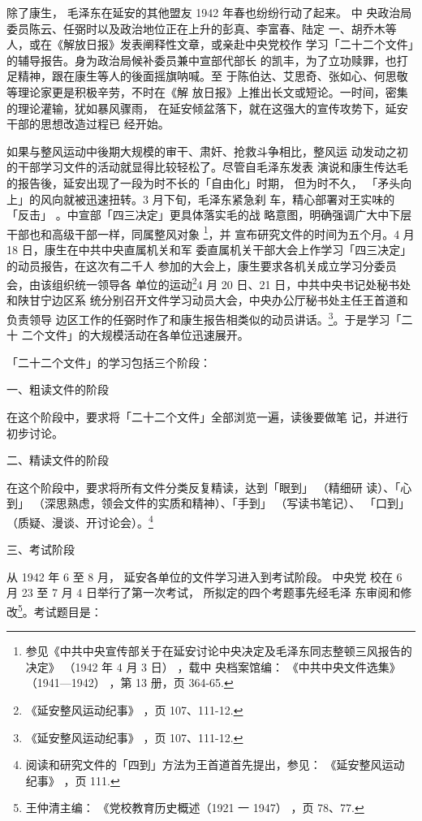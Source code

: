 除了康生，
毛泽东在延安的其他盟友 1942 年春也纷纷行动了起来。
中
央政治局委员陈云、任弼时以及政治地位正在上升的彭真、李富春、陆定
一、胡乔木等人，或在《解放日报》发表阐释性文章，或亲赴中央党校作
学习「二十二个文件」的辅导报告。身为政治局候补委员兼中宣部代部长
的凯丰，为了立功赎罪，也打足精神，跟在康生等人的後面摇旗呐喊。至
于陈伯达、艾思奇、张如心、何思敬等理论家更是积极辛劳，不时在《解
放日报》上推出长文或短论。一时间，密集的理论灌输，犹如暴风骤雨，
在延安倾盆落下，就在这强大的宣传攻势下，延安干部的思想改造过程已
经开始。

如果与整风运动中後期大规模的审干、肃奸、抢救斗争相比，整风运
动发动之初的干部学习文件的活动就显得比较轻松了。尽管自毛泽东发表
演说和康生传达毛的报告後，延安出现了一段为时不长的「自由化」时期，
但为时不久，
「矛头向上」的风向就被迅速扭转。3 月下旬，毛泽东紧急刹
车，精心部署对王实味的「反击」
。中宣部「四三决定」更具体落实毛的战
略意图，明确强调广大中下层干部也和高级干部一样，同属整风对象
\footnote{参见《中共中央宣传部关于在延安讨论中央决定及毛泽东同志整顿三风报告的决定》
（1942 年 4 月 3 日）
，载中
央档案馆编：
《中共中央文件选集》
（1941—1942）
，第 13 册，页 364-65.}，并
宣布研究文件的时间为五个月。4 月 18 日，康生在中共中央直属机关和军
委直属机关干部大会上作学习「四三决定」的动员报告，在这次有二千人
参加的大会上，康生要求各机关成立学习分委员会，由该组织统一领导各
单位的运动\footnote{《延安整风运动纪事》
，页 107、111-12.}4 月 20 日、21 日，中共中央书记处秘书处和陕甘宁边区系
统分别召开文件学习动员大会，中央办公厅秘书处主任王首道和负责领导
边区工作的任弼时作了和康生报告相类似的动员讲话。\footnote{《延安整风运动纪事》
，页 107、111-12.}。于是学习「二十
二个文件」的大规模活动在各单位迅速展开。

「二十二个文件」的学习包括三个阶段：

一、粗读文件的阶段

在这个阶段中，要求将「二十二个文件」全部浏览一遍，读後要做笔
记，并进行初步讨论。

二、精读文件的阶段

在这个阶段中，要求将所有文件分类反复精读，达到「眼到」
（精细研
读）、「心到」
（深思熟虑，领会文件的实质和精神）、「手到」
（写读书笔记）、
「口到」
（质疑、漫谈、开讨论会）。\footnote{阅读和研究文件的「四到」方法为王首道首先提出，参见：
《延安整风运动纪事》
，页 111.} 

三、考试阶段

从 1942 年 6 至 8 月，
延安各单位的文件学习进入到考试阶段。
中央党
校在 6 月 23 至 7 月 4 日举行了第一次考试，
所拟定的四个考题事先经毛泽
东审阅和修改\footnote{王仲清主编：
《党校教育历史概述（1921 一 1947）
，页 78、77.}。考试题目是：

